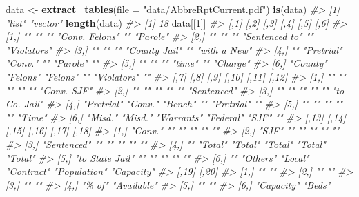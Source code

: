\documentclass[
  12pt,
]{book}
\newenvironment{Shaded}{\begin{snugshade}}{\end{snugshade}}
\newcommand{\CommentTok}[1]{\textcolor[rgb]{0.56,0.35,0.01}{\textit{#1}}}
\newcommand{\DataTypeTok}[1]{\textcolor[rgb]{0.13,0.29,0.53}{#1}}
\newcommand{\DecValTok}[1]{\textcolor[rgb]{0.00,0.00,0.81}{#1}}
\newcommand{\KeywordTok}[1]{\textcolor[rgb]{0.13,0.29,0.53}{\textbf{#1}}}
\newcommand{\NormalTok}[1]{#1}
\newcommand{\StringTok}[1]{\textcolor[rgb]{0.31,0.60,0.02}{#1}}
\begin{document}
\begin{Shaded}
\begin{Highlighting}[]
\NormalTok{data <{-}}\StringTok{ }\KeywordTok{extract\_tables}\NormalTok{(}\DataTypeTok{file =} \StringTok{"data/AbbreRptCurrent.pdf"}\NormalTok{)}
\KeywordTok{is}\NormalTok{(data)}
\CommentTok{\#> [1] "list"   "vector"}
\KeywordTok{length}\NormalTok{(data)}
\CommentTok{\#> [1] 18}
\NormalTok{data[[}\DecValTok{1}\NormalTok{]]}
\CommentTok{\#>      [,1]     [,2]       [,3]     [,4]           [,5]        [,6]        }
\CommentTok{\#> [1,] ""       ""         ""       "Conv. Felons" ""          "Parole"    }
\CommentTok{\#> [2,] ""       ""         ""       "Sentenced to" ""          "Violators" }
\CommentTok{\#> [3,] ""       ""         ""       "County Jail"  ""          "with a New"}
\CommentTok{\#> [4,] ""       "Pretrial" "Conv."  ""             "Parole"    ""          }
\CommentTok{\#> [5,] ""       ""         ""       "time"         ""          "Charge"    }
\CommentTok{\#> [6,] "County" "Felons"   "Felons" ""             "Violators" ""          }
\CommentTok{\#>      [,7]       [,8]    [,9]       [,10]     [,11]      [,12]        }
\CommentTok{\#> [1,] ""         ""      ""         ""        ""         "Conv. SJF"  }
\CommentTok{\#> [2,] ""         ""      ""         ""        ""         "Sentenced"  }
\CommentTok{\#> [3,] ""         ""      ""         ""        ""         "to Co. Jail"}
\CommentTok{\#> [4,] "Pretrial" "Conv." "Bench"    ""        "Pretrial" ""           }
\CommentTok{\#> [5,] ""         ""      ""         ""        ""         "Time"       }
\CommentTok{\#> [6,] "Misd."    "Misd." "Warrants" "Federal" "SJF"      ""           }
\CommentTok{\#>      [,13]           [,14]    [,15]   [,16]      [,17]        [,18]     }
\CommentTok{\#> [1,] "Conv."         ""       ""      ""         ""           ""        }
\CommentTok{\#> [2,] "SJF"           ""       ""      ""         ""           ""        }
\CommentTok{\#> [3,] "Sentenced"     ""       ""      ""         ""           ""        }
\CommentTok{\#> [4,] ""              "Total"  "Total" "Total"    "Total"      "Total"   }
\CommentTok{\#> [5,] "to State Jail" ""       ""      ""         ""           ""        }
\CommentTok{\#> [6,] ""              "Others" "Local" "Contract" "Population" "Capacity"}
\CommentTok{\#>      [,19]      [,20]      }
\CommentTok{\#> [1,] ""         ""         }
\CommentTok{\#> [2,] ""         ""         }
\CommentTok{\#> [3,] ""         ""         }
\CommentTok{\#> [4,] "\% of"     "Available"}
\CommentTok{\#> [5,] ""         ""         }
\CommentTok{\#> [6,] "Capacity" "Beds"}

\end{Highlighting}
\end{Shaded}
\end{document}
